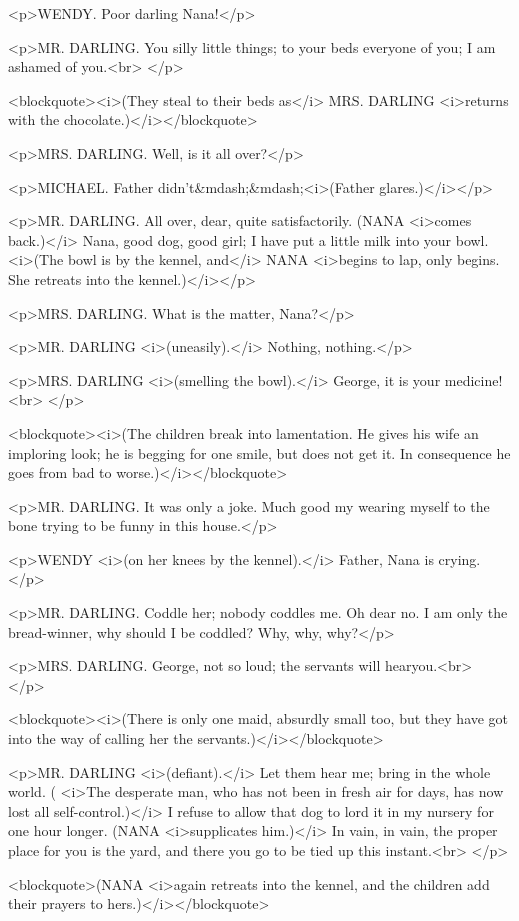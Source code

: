 <p>WENDY. Poor darling Nana!</p>

<p>MR. DARLING. You silly little things; to your beds everyone of
you; I am ashamed of you.<br>
</p>

<blockquote><i>(They steal to their beds as</i> MRS. DARLING
<i>returns with the chocolate.)</i></blockquote>

<p>MRS. DARLING. Well, is it all over?</p>

<p>MICHAEL. Father didn't&mdash;&mdash;<i>(Father glares.)</i></p>

<p>MR. DARLING. All over, dear, quite satisfactorily. (NANA <i>comes
back.)</i> Nana, good dog, good girl; I have put a little milk into
your bowl. <i>(The bowl is by the kennel, and</i> NANA <i>begins to
lap, only begins. She retreats into the kennel.)</i></p>

<p>MRS. DARLING. What is the matter, Nana?</p>

<p>MR. DARLING <i>(uneasily).</i> Nothing, nothing.</p>

<p>MRS. DARLING <i>(smelling the bowl).</i> George, it is your
medicine!<br>
</p>

<blockquote><i>(The children break into lamentation. He gives his
wife an imploring look; he is begging for one smile, but does not get
it. In consequence he goes from bad to worse.)</i></blockquote>

<p>MR. DARLING. It was only a joke. Much good my wearing myself to
the bone trying to be funny in this house.</p>

<p>WENDY <i>(on her knees by the kennel).</i> Father, Nana is
crying.</p>

<p>MR. DARLING. Coddle her; nobody coddles me. Oh dear no. I am only
the bread-winner, why should I be coddled? Why, why, why?</p>

<p>MRS. DARLING. George, not so loud; the servants will hearyou.<br>
</p>

<blockquote><i>(There is only one maid, absurdly small too, but they
have got into the way of calling her the servants.)</i></blockquote>

<p>MR. DARLING <i>(defiant).</i> Let them hear me; bring in the whole
world. ( <i>The desperate man, who has not been in fresh air for
days, has now lost all self-control.)</i> I refuse to allow that dog
to lord it in my nursery for one hour longer. (NANA <i>supplicates
him.)</i> In vain, in vain, the proper place for you is the yard, and
there you go to be tied up this instant.<br>
</p>

<blockquote>(NANA <i>again retreats into the kennel, and the children
add their prayers to hers.)</i></blockquote>

